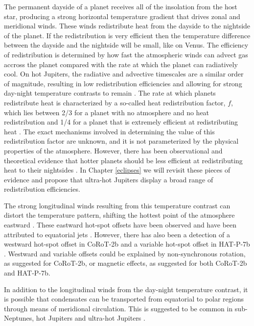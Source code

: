 The permanent dayside of a planet receives all of the insolation from the host star, producing a strong horizontal temperature gradient that drives zonal and meridional winds. These winds redistribute heat from the dayside to the nightside of the planet. If the redistribution is very efficient then the temperature difference between the dayside and the nightside will be small, like on Venus. The efficiency of redistribution is determined by how fast the atmospheric winds can advect gas accross the planet compared with the rate at which the planet can radiatively cool. On hot Jupiters, the radiative and advective timescales are a similar order of magnitude, resulting in low redistribution efficiencies and allowing for strong day-night temperature contrasts to remain \citep[e.g.,][]{Showman2002, Perna2012}. The rate at which planets redistribute heat is characterized by a so-called heat redistribution factor, $f$, which lies between 2/3 for a planet with no atmosphere and no heat redistribution and 1/4 for a planet that is extremely efficient at redistributing heat \citep[e.g.,][]{Koll2019}. The exact mechanisms involved in determining the value of this redistribution factor are unknown, and it is not parameterized by the physical properties of the atmosphere. However, there has been observational and theoretical evidence that hotter planets should be less efficient at redistributing heat to their nightsides \citep{Perez-Becker2013, Schwartz2015}. In Chapter \ref{eclipses} we will revisit these pieces of evidence and propose that ultra-hot Jupiters display a broad range of redistribution efficiencies.

The strong longitudinal winds resulting from this temperature contrast can distort the temperature pattern, shifting the hottest point of the atmosphere eastward \citep[e.g.,][]{Showman2002}. These eastward hot-spot offsets have been observed and have been attributed to equatorial jets \citep[e.g.,][]{Knutson2012, Cowan2012a}. However, there has also been a detection of a westward hot-spot offset in CoRoT-2b \citep{Dang2018} and a variable hot-spot offset in HAT-P-7b \citep{Armstrong2016}. Westward and variable offsets could be explained by non-synchronous rotation, as suggested for CoRoT-2b, or magnetic effects, as suggested for both CoRoT-2b and HAT-P-7b.

In addition to the longitudinal winds from the day-night temperature contrast, it is possible that condensates can be transported from equatorial to polar regions through means of meridional circulation. This is suggested to be common in sub-Neptunes, hot Jupiters and ultra-hot Jupiters \citep{Parmentier2013, Ehrenreich2020}.

